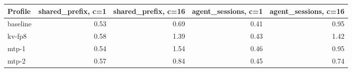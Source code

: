\begin{tabular}{lrrrr}
\toprule
Profile & shared\_prefix, c=1 & shared\_prefix, c=16 & agent\_sessions, c=1 & agent\_sessions, c=16 \\
\midrule
baseline & 0.53 & 0.69 & 0.41 & 0.95 \\
kv-fp8 & 0.58 & 1.39 & 0.43 & 1.42 \\
mtp-1 & 0.54 & 1.54 & 0.46 & 0.95 \\
mtp-2 & 0.57 & 0.84 & 0.45 & 0.74 \\
\bottomrule
\end{tabular}
